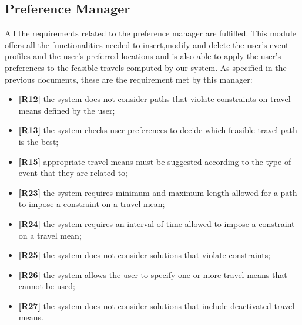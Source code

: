 \subsection{Preference Manager}
All the requirements related to the preference manager are fulfilled.
This module offers all the functionalities needed to insert,modify and delete the user's event profiles and the user's preferred locations and is also able to apply the user's preferences to the feasible travels computed by our system.
As specified in the previous documents, these are the requirement met by this manager:
\begin{itemize}
	\item \textbf{[R12]} the system does not consider paths that violate constraints on travel means defined by the user;
	\item \textbf{[R13]} the system checks user preferences to decide which feasible travel path is the best;
	\item \textbf{[R15]} appropriate travel means must be suggested according to the type of event that they are related to;
	\item  \textbf{[R23]} the system requires minimum and maximum length allowed for a path to impose a constraint on a travel mean;
	\item \textbf{[R24]} the system requires an interval of time allowed to impose a constraint on a travel mean;
	\item \textbf{[R25]} the system does not consider solutions that violate constraints;
	\item \textbf{[R26]} the system allows the user to specify one or more travel means that cannot be used;
	\item \textbf{[R27]} the system does not consider solutions that include deactivated travel means.
\end{itemize}

